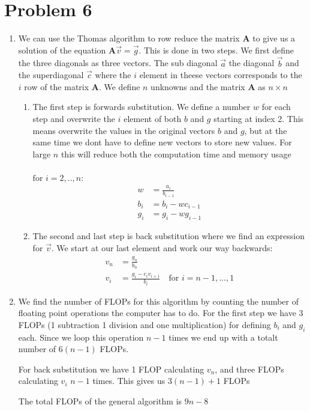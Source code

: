 \documentclass[english,notitlepage]{revtex4-1}  %
\begin{document}
\section*{Problem 6}
\begin{enumerate}[label= \alph*)]
  \item We can use the Thomas algorithm to row reduce the matrix $\boldsymbol{A}$ to give us a solution of the equation $\boldsymbol{A} \vec{v} = \vec{g}$. This is done in two steps. We first define the three diagonals as three vectors. The sub diagonal $\vec{a}$ the diagonal $\vec{b}$ and the superdiagonal $\vec{c}$ where the $i$ element in theese vectors corresponds to the $i$ row of the matrix $\boldsymbol{A}$. We define $n$ unknowns and the matrix $\boldsymbol{A}$ as $n\times n$
  \begin{enumerate}[label=\roman*)]
    \item The first step is forwards substitution. We define a number $w$ for each step and overwrite the $i$ element of both $b$ and $g$ starting at index 2. This means overwrite the values in the original vectors $b$ and $g$, but at the same time we dont have to define new vectors to store new values. For large $n$ this will reduce both the computation time and memory usage\\\\
    $\text{for }i=2,..,n$:
    \begin{align*}
      w &= \frac{a_i}{b_{i-1}} \\
      b_i &= b_i - wc_{i-1} \\
      g_i &= g_i - wg_{i-1}
    \end{align*}
    \item The second and last step is back substitution where we find an expression for $\vec{v}$. We start at our last element and work our way backwards:
    \begin{align*}
      v_n &= \frac{g_n}{b_n} \\
      v_i &= \frac{g_i - c_i v_ {i+1}}{b_i} \quad \text{for } i = n-1,...,1
    \end{align*}
  \end{enumerate}
  \item We find the number of FLOPs for this algorithm by counting the number of floating point operations the computer has to do. For the first step we have 3 FLOPs (1 subtraction 1 division and one multiplication) for defining $b_i$ and  $g_i$ each. Since we loop this operation $n-1$ times we end up with a  totalt number of $6(n-1)$ FLOPs.

  For back substitution we have 1 FLOP calculating $v_n$, and three FLOPs calculating $v_i$ $n-1$ times. This gives us $3(n-1)+1$ FLOPs

  The total FLOPs of the general algorithm is $9n-8$
\end{enumerate}
\end{document}
